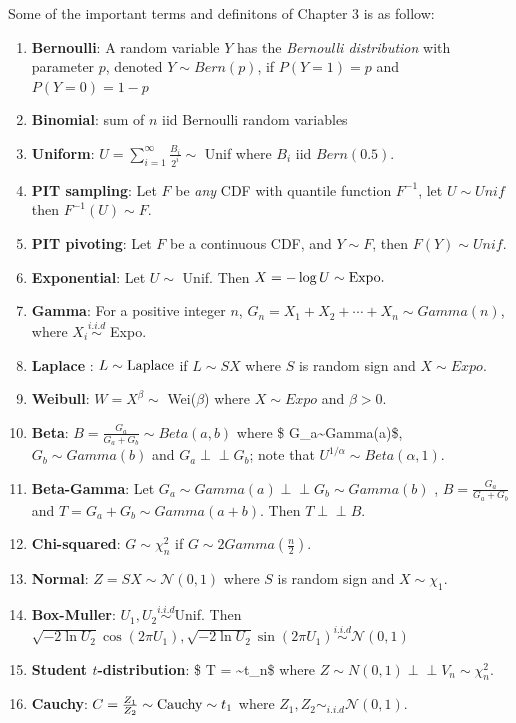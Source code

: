 \documentclass[
  letterpaper,
  DIV=11,
  numbers=noendperiod]{scrreprt}
\theoremstyle{definition}
\theoremstyle{plain}
\theoremstyle{remark}
\begin{document}

Some of the important terms and definitons of Chapter 3 is as follow:

\begin{enumerate}
\def\labelenumi{\arabic{enumi}.}
\item
  \textbf{Bernoulli}: A random variable \(Y\) has the \emph{Bernoulli
  distribution} with parameter \(p\), denoted \(Y\sim Bern(p)\), if
  \(P(Y=1)=p\) and \(P(Y=0)=1-p\)
\item
  \textbf{Binomial}: sum of \(n\) iid Bernoulli random variables
\item
  \textbf{Uniform}: \(U = \sum_{i=1}^\infty \frac{B_i}{2^i} \sim\) Unif
  where \(B_i\) iid \(Bern(0.5)\).
\item
  \textbf{PIT sampling}: Let \(F\) be \textit{any} CDF with quantile
  function \(F^{-1}\), let \(U \sim Unif\) then \(F^{-1}(U) \sim F.\)
\item
  \textbf{PIT pivoting}: Let \(F\) be a continuous CDF, and
  \(Y \sim F\), then \(F(Y)\sim Unif.\)
\item
  \textbf{Exponential}: Let \(U\sim\) Unif. Then
  \(X = -\log U \sim \textnormal{Expo}.\)
\item
  \textbf{Gamma}: For a positive integer \(n\),
  \(G_n= X_1+X_2+\cdots + X_n \sim Gamma(n)\), where
  \(X_i \overset{i.i.d}{\sim}\) Expo.
\item
  \textbf{Laplace} : \(L \sim \textnormal{Laplace}\) if \(L \sim SX\)
  where \(S\) is random sign and \(X\sim Expo.\)
\item
  \textbf{Weibull}: \(W = X^\beta \sim\) Wei(\(\beta\)) where
  \(X \sim Expo\) and \(\beta >0.\)
\item
  \textbf{Beta}: \(B = \frac{G_a}{G_a+G_b} \sim Beta(a,b)\) where \$
  G\_a\sim Gamma(a)\$, \(G_b\sim Gamma(b)\) and
  \(G_a \perp\!\!\!\!\perp G_b\); note that
  \(U^{1/\alpha} \sim Beta(\alpha,1).\)
\item
  \textbf{Beta-Gamma}: Let
  \(G_a \sim Gamma(a) \perp\!\!\!\!\perp G_b\sim Gamma(b)\) ,
  \(B = \frac{G_a}{G_a+G_b}\) and \(T = G_a + G_b \sim Gamma(a+b).\)
  Then \(T \perp\!\!\!\!\perp B.\)
\item
  \textbf{Chi-squared}: \(G \sim \chi_n^2\) if
  \(G\sim 2Gamma\left(\frac{n}{2}\right).\)
\item
  \textbf{Normal}: \(Z = SX \sim \mathcal{N}(0,1)\) where \(S\) is
  random sign and \(X\sim \chi_1.\)
\item
  \textbf{Box-Muller}: \(U_1,U_2 \overset{i.i.d}{\sim}\)Unif. Then
  \(\sqrt{-2\ln U_2}\cos{(2\pi U_1)}, \sqrt{-2\ln U_2}\sin{(2\pi U_1)} \overset{i.i.d}{\sim} \mathcal{N}(0,1)\)
\item
  \textbf{Student \(t\)-distribution}: \$ T = 
  \sim t\_n\$ where
  \(Z \sim N(0,1) \perp\!\!\!\!\perp V_n \sim \chi_n^2.\)
\item
  \textbf{Cauchy}:
  \(C = \frac{Z_1}{Z_2} \sim \textnormal{Cauchy} \sim t_1\) where
  \(Z_1,Z_2 \sim_{i.i.d} \mathcal{N}(0,1)\).
\end{enumerate}
\end{document}
